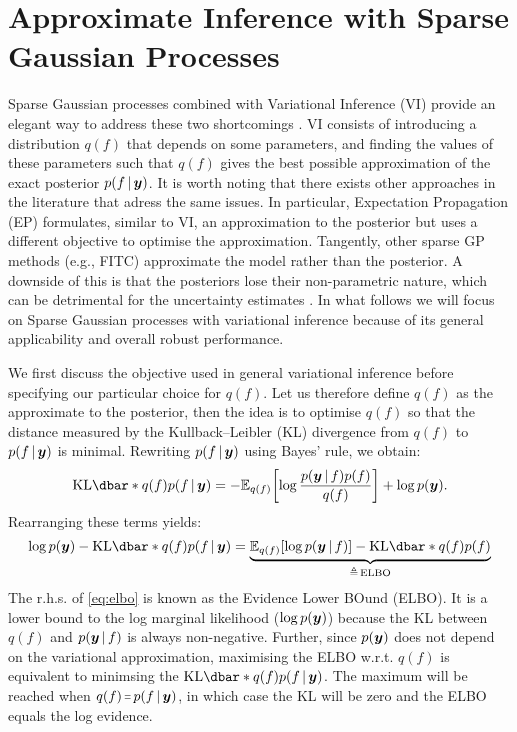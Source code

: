 \section{Approximate Inference with Sparse Gaussian Processes}

Sparse Gaussian processes combined with Variational Inference (VI) provide an elegant way to address these two shortcomings \citep{titsias2009, hensman2013, hensman2015scalable}. VI consists of introducing a distribution $q(f)$ that depends on some parameters, and finding the values of these parameters such that $q(f)$ gives the best possible approximation of the exact posterior $p(f \,|\, \bm{y} )$. It is worth noting that there exists other approaches in the literature that adress the same issues. In particular, Expectation Propagation (EP) \citep{minka2001expectation,bui2017unifying} formulates, similar to VI, an approximation to the posterior but uses a different objective to optimise the approximation. Tangently, other sparse GP methods (e.g., FITC) \citep{Snelson05,quinonero2005unifying} approximate the model rather than the posterior. A downside of this is that the posteriors lose their non-parametric nature, which can be detrimental for the uncertainty estimates \citep{bauer2016understanding}. In what follows we will focus on Sparse Gaussian processes with variational inference because of its general applicability and overall robust performance.

We first discuss the objective used in general variational inference before specifying our particular choice for $q(f)$. Let us therefore define $q(f)$ as the approximate to the posterior, then the idea is to optimise $q(f)$ so that the distance measured by the Kullback–Leibler (KL) divergence from $q(f)$ to $p(f \,|\, \bm{y})$ is minimal. Rewriting $p(f \,|\, \bm{y})$ using Bayes' rule, we obtain:
\begin{equation}
  \KL{q(f)}{p(f \given \vy)} = -{\Exp{q(f)}{\log \frac{p(\vy \given f) p(f)}{q(f)}}} + \log p(\vy).
\end{equation}
Rearranging these terms yields:
\begin{equation}
  \label{eq:elbo}
  \log p(\vy) - \KL{q(f)}{p(f \given \vy)} = 
  \underbrace{\Exp{q(f)}{\log p(\vy \given f)} - \KL{q(f)}{p(f)}}_{\triangleq\,\textrm{ELBO}}
\end{equation}
The r.h.s. of \cref{eq:elbo} is known as the Evidence Lower BOund (ELBO). It is a lower bound to the log marginal likelihood ($\log p(\bm{y})$) because the KL between $q(f)$ and $p(\bm{y} \,|\, f)$ is always non-negative. Further, since $p(\bm{y})$ does not depend on the variational approximation, maximising the ELBO w.r.t. $q(f)$ is equivalent to minimsing the $\KL{q(f)}{p(f \given \vy)}$. The maximum will be reached when $q(f) \shorteq p(f \given \vy)$, in which case the KL will be zero and the ELBO equals the log evidence. 

